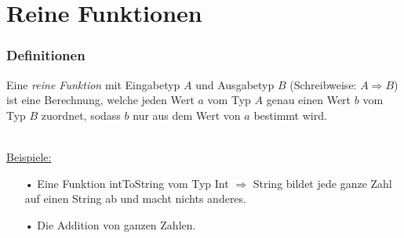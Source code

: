 	\section[Section]{Reine Funktionen}
	\begin{frame}
		\frametitle{Definitionen}
		\begin{definition}
			Eine \emph{reine Funktion} mit Eingabetyp $A$ und Ausgabetyp $B$ (Schreibweise: $A				\Rightarrow B$)
			ist eine Berechnung, welche jeden Wert $a$ vom Typ $A$ genau einen Wert 			$b$ vom Typ $B$ zuordnet, sodass $b$ nur aus dem Wert von $a$ bestimmt 				wird.
		\end{definition} 
		\leavevmode \\
		\underline{Beispiele:}
		\begin{itemize}
		\item[•] Eine Funktion intToString vom Typ Int $\Rightarrow$ String bildet 
		jede ganze Zahl auf einen String ab und macht nichts anderes.
		\item[•] Die Addition von ganzen Zahlen. 
		\end{itemize}
	\end{frame}
	